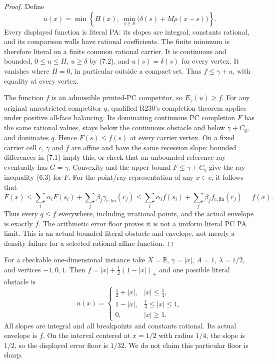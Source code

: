 \documentclass[11pt]{article}
\newcommand{\R}{\mathbb R}\newcommand{\Q}{\mathbb Q}\newcommand{\Z}{\mathbb Z}
\begin{document}
\begin{proof}
Define
\[
 u(x)=\min\left\{H(x),\ \min_{s\in S}\bigl(\delta(s)+M\rho(x-s)\bigr)\right\}.
                                                                    \tag{7.3}
\]
Every displayed function is literal PA: its slopes are integral, constants rational, and its comparison walls have rational coefficients. The finite minimum is therefore literal on a finite common rational carrier. It is continuous and bounded, $0\leq u\leq H$, $u\geq\delta$ by (7.2), and $u(s)=\delta(s)$ for every vertex. It vanishes where $H=0$, in particular outside a compact set. Thus $f\leq\gamma+u$, with equality at every vertex.

The function $f$ is an admissible printed-PC competitor, so $E_\gamma(u)\geq f$. For any original unrestricted competitor $q$, qualified R230's completion theorem applies under positive all-face balancing. Its dominating continuous PC completion $F$ has the same rational values, stays below the continuous obstacle and below $\gamma+C_q$, and dominates $q$. Hence $F(s)\leq f(s)$ at every carrier vertex. On a fixed carrier cell $c$, $\gamma$ and $f$ are affine and have the same recession slope: bounded differences in (7.1) imply this, or check that an unbounded reference ray eventually has $G=\gamma$. Convexity and the upper bound $F\leq\gamma+C_q$ give the ray inequality (6.3) for $F$. For the point/ray representation of any $x\in c$, it follows that
\[
 F(x)\leq\sum_i\alpha_i F(s_i)+\sum_j\beta_j\gamma_{c,\mathrm{lin}}(r_j)
 \leq\sum_i\alpha_i f(s_i)+\sum_j\beta_j f_{c,\mathrm{lin}}(r_j)=f(x).
\]
Thus every $q\leq f$ everywhere, including irrational points, and the actual envelope is exactly $f$. The arithmetic error floor proves it is not a uniform literal PC PA limit. This is an actual bounded literal obstacle and envelope, not merely a density failure for a selected rational-affine function.
\end{proof}

For a checkable one-dimensional instance take $X=\R$, $\gamma=|x|$, $A=1$, $\lambda=1/2$, and vertices $-1,0,1$. Then $f=|x|+\tfrac12(1-|x|)_+$ and one possible literal obstacle is
\[
 u(x)=\begin{cases}\frac12+|x|,&|x|\leq\frac14,\\1-|x|,&\frac14\leq|x|\leq1,\\0,&|x|\geq1.\end{cases}            \tag{7.4}
\]
All slopes are integral and all breakpoints and constants rational. Its actual envelope is $f$. On the interval centered at $x=1/2$ with radius $1/4$, the slope is $1/2$, so the displayed error floor is $1/32$. We do not claim this particular floor is sharp.
\end{document}
